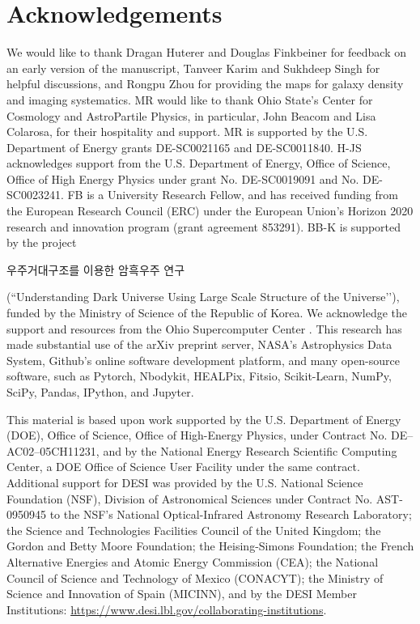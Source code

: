 \section*{Acknowledgements}
We would like to thank Dragan Huterer and Douglas Finkbeiner for feedback on an early version of the manuscript, Tanveer Karim and Sukhdeep Singh for helpful discussions, and Rongpu Zhou for providing the maps for galaxy density and imaging systematics. MR would like to thank Ohio State's Center for Cosmology and AstroPartile Physics, in particular, John Beacom and Lisa Colarosa, for their hospitality and support. MR is supported by the U.S. Department of Energy grants DE-SC0021165 and DE-SC0011840. H-JS acknowledges support from the U.S. Department of Energy, Office of Science, 
Office of High Energy Physics under grant No. DE-SC0019091 and No. DE-SC0023241. FB is a University Research Fellow, and has received funding from the European Research Council (ERC) under the European Union’s Horizon 2020 research and innovation program (grant agreement 853291). BB-K is supported by the project \begin{CJK}{UTF8}{mj}우주거대구조를 이용한 암흑우주 연구\end{CJK} (``Understanding Dark Universe Using Large Scale Structure of the Universe’’), funded by the Ministry of Science of the Republic of Korea. We acknowledge the support and resources from the Ohio Supercomputer Center \citep[OSC;][]{OhioSupercomputerCenter1987}. This research has made substantial use of the arXiv preprint server, NASA’s Astrophysics Data System, Github's online software development platform, and many open-source software, such as Pytorch, Nbodykit, HEALPix, Fitsio, Scikit-Learn, NumPy, SciPy, Pandas, IPython, and Jupyter. 


This material is based upon work supported by the U.S. Department of Energy (DOE), Office of Science, Office of High-Energy Physics, under Contract No. DE–AC02–05CH11231, and by the National Energy Research Scientific Computing Center, a DOE Office of Science User Facility under the same contract. Additional support for DESI was provided by the U.S. National Science Foundation (NSF), Division of Astronomical Sciences under Contract No. AST-0950945 to the NSF's National Optical-Infrared Astronomy Research Laboratory; the Science and Technologies Facilities Council of the United Kingdom; the Gordon and Betty Moore Foundation; the Heising-Simons Foundation; the French Alternative Energies and Atomic Energy Commission (CEA); the National Council of Science and Technology of Mexico (CONACYT); the Ministry of Science and Innovation of Spain (MICINN), and by the DESI Member Institutions: \href{https://www.desi.lbl.gov/collaborating-institutions}{https://www.desi.lbl.gov/collaborating-institutions}.

